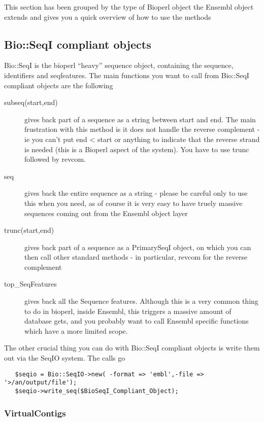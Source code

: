 \documentclass[11pt,a4paper]{article}
\begin{document}
This section has been grouped by the type of Bioperl object the Ensembl
object extends and gives you a quick overview of how to use the methods

\subsection{Bio::SeqI compliant objects}

Bio::SeqI is the bioperl ``heavy'' sequence object, containing the
sequence, identifiers and seqfeatures. The main functions you want to
call from Bio::SeqI compliant objects are the following

\begin{description}
\item[subseq(start,end)] gives back part of a sequence as a string between start and end. The main
frustration with this method is it does not handle the reverse complement - ie you can't put end < start or 
anything to indicate that the reverse strand is needed (this is a Bioperl aspect of the system). You have
to use trunc followed by revcom.
\item[seq] gives back the entire sequence as a string - please be careful only to use this when
you need, as of course it is very easy to have truely massive sequences coming out from the
Ensembl object layer
\item[trunc(start,end)] gives back part of a sequence as a PrimarySeqI object, on which you
can then call other standard methods - in particular, revcom for the reverse complement
\item[top\_SeqFeatures] gives back all the Sequence features. Although this is a very common
thing to do in bioperl, inside Ensembl, this triggers a massive amount of database gets, and you
probably want to call Ensembl specific functions which have a more limited scope.
\end{description}

The other crucial thing you can do with Bio::SeqI compliant objects is write them out
via the SeqIO system. The calls go

\begin{verbatim}
   $seqio = Bio::SeqIO->new( -format => 'embl',-file => '>/an/output/file');
   $seqio->write_seq($BioSeqI_Compliant_Object);
\end{verbatim}

\subsubsection{VirtualContigs}
\end{document}
